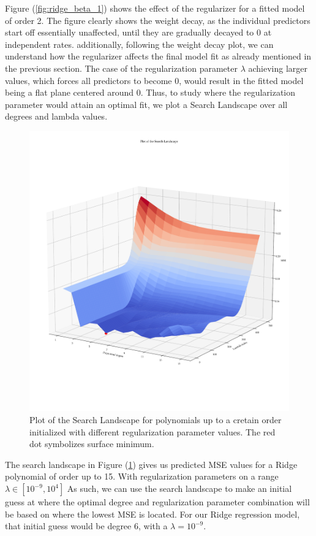 \documentclass[11pt, a4paper]{article}
\begin{document}
Figure (\ref{fig:ridge_beta_1}) shows the effect of the regularizer for a fitted model of order 2. The figure clearly shows the weight decay, as the individual predictors start off essentially unaffected, until they are gradually decayed to 0 at independent rates. additionally, following the weight decay plot, we can understand how the regularizer affects the final model fit as already mentioned in the previous section. The case of the regularization parameter $\lambda$ achieving larger values, which forces all predictors to become 0, would result in the fitted model being a flat plane centered around 0. Thus, to study where the regularization parameter would attain an optimal fit, we plot a Search Landscape over all degrees and lambda values.

\begin{figure}
  \centering
  \hspace*{-3.5cm}
  \includegraphics[scale=0.58]{figures/EX4_search_landscape_plt.pdf}
  \caption{\label{fig:ridge_search_land}Plot of the Search Landscape for polynomials up to a cretain order initialized with different regularization parameter values. The red dot symbolizes surface minimum.}
\end{figure}

The search landscape in Figure (\ref{fig:ridge_search_land}) gives us predicted MSE values for a Ridge polynomial of order up to 15. With regularization parameters on a range $\lambda \in \left[10^{-9},10^{4}\right]$ As such, we can use the search landscape to make an initial guess at where the optimal degree and regularization parameter combination will be based on where the lowest MSE is located. For our Ridge regression model, that initial guess would be degree 6, with a $\lambda = 10^{-9}$.
\end{document}
